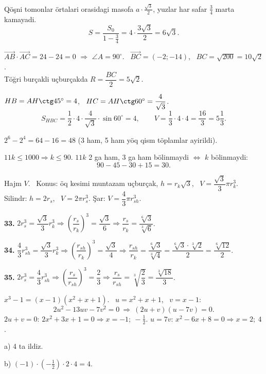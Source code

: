 Qöşni tomonlar örtalari orasidagi masofa $a\cdot\frac{\sqrt3}2$, yuzlar har safar $\frac34$ marta kamayadi.
\[S=\frac{S_0}{1-\frac34}=4\cdot\frac{3\sqrt3}2=6\sqrt3.\]

$\overrightarrow{AB}\cdot\overrightarrow{AC}=24-24=0$ $\Rightarrow$ $\angle A=90^\circ$. \ $\overrightarrow{BC}=(-2;-14)$, \ $BC=\sqrt{200}=10\sqrt2$.\\
Töğri burçakli uçburçakda $R=\dfrac{BC}2=5\sqrt2$.

$HB=AH\ctg45^\circ=4$, \ $HC=AH\ctg60^\circ=\dfrac4{\sqrt3}$.
\[S_{HBC}=\frac12\cdot4\cdot\frac4{\sqrt3}\cdot\sin60^\circ=4,\qquad V=\frac13\cdot4\cdot4=\frac{16}3=5\frac13.\]

$2^6-2^4=64-16=48$ (3 ham, 5 ham yöq qism töplamlar ayirildi).

$11k\le1000\Rightarrow k\le90$. $11k$ 2 ga ham, 3 ga ham bölinmaydi $\iff$ $k$ bölinmaydi:
\[90-45-30+15=30.\]

\newpage
{}
Hajm $V$. \ Konus: öq kesimi muntazam uçburçak, $h=r_k\sqrt3$, \ $V=\dfrac{\sqrt3}3\pi r_k^3$.\\
Silindr: $h=2r_s$, \ $V=2\pi r_s^3$. \quad Şar: $V=\dfrac43\pi r_{sh}^3$.

\textbf{33.} $2r_s^3=\dfrac{\sqrt3}3r_k^3\Rightarrow\left(\dfrac{r_s}{r_k}\right)^3=\dfrac{\sqrt3}6\Rightarrow\dfrac{r_s}{r_k}=\dfrac{\sqrt[6]3}{\sqrt[3]6}$.

\textbf{34.} $\dfrac43r_{sh}^3=\dfrac{\sqrt3}3r_k^3\Rightarrow\left(\dfrac{r_{sh}}{r_k}\right)^3=\dfrac{\sqrt3}4\Rightarrow\dfrac{r_{sh}}{r_k}=\dfrac{\sqrt[6]3}{\sqrt[3]4}=\dfrac{\sqrt[6]3\cdot\sqrt[3]2}{2}=\dfrac{\sqrt[6]{12}}2$.

\textbf{35.} $2r_s^3=\dfrac43r_{sh}^3\Rightarrow\left(\dfrac{r_s}{r_{sh}}\right)^3=\dfrac23\Rightarrow\dfrac{r_s}{r_{sh}}=\sqrt[3]{\dfrac23}=\dfrac{\sqrt[3]{18}}3$.

\newpage
{}
$x^3-1=(x-1)(x^2+x+1)$. \ $u=x^2+x+1$, \ $v=x-1$:
\[2u^2-13uv-7v^2=0\ \Rightarrow\ (2u+v)(u-7v)=0.\]
$2u+v=0$: $2x^2+3x+1=0\Rightarrow x=-1;\ -\frac12$. \quad $u=7v$: $x^2-6x+8=0\Rightarrow x=2;\ 4$.

a) 4 ta ildiz.

b) $(-1)\cdot\left(-\frac12\right)\cdot2\cdot4=4$.

